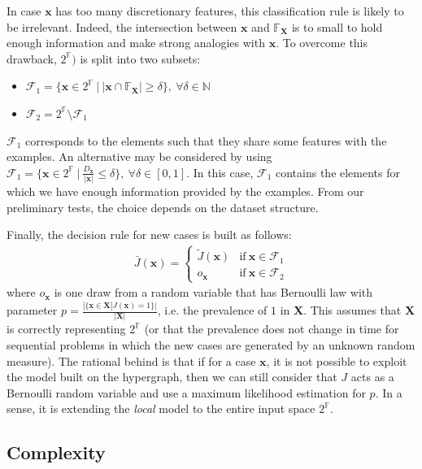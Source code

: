 \documentclass[preprint,12pt]{elsarticle}
\theoremstyle{definition}
\begin{document}
In case $\mathbf x$ has too many discretionary features, this classification rule is likely to be irrelevant. Indeed, the intersection between $\mathbf x$ and $\mathbb{F}_{\mathbf X}$ is to small to hold enough information and make strong analogies with $\mathbf x$. To overcome this drawback, $2^{\mathbb F})$ is split into two subsets:
\begin{itemize}
  \item $\mathcal{F}_1 = \{ \mathbf  x \in 2^{\mathbb F} ~ | ~ |\mathbf x \cap \mathbb{F}_{\mathbf X}| \geq \delta\}, ~ \forall \delta \in \mathbb{N}$
  \item $\mathcal{F}_2 = 2^{\mathbb F} \setminus \mathcal{F}_1$
\end{itemize}
$\mathcal{F}_1$ corresponds to the elements such that they share some features with the examples. An alternative may be considered by using $\mathcal{F}_1 = \{\mathbf  x \in 2^{\mathbb F} ~ | ~ \frac{D_\mathbf x}{|\mathbf x|} \leq \delta\}, ~ \forall \delta \in [0,1]$. In this case, $\mathcal{F}_1$ contains the elements for which we have enough information provided by the examples. From our preliminary tests, the choice depends on the dataset structure.

Finally, the decision rule for new cases is built as follows:
\begin{align}
\tag{R2} \label{eqn:updated_cr}
 \bar J(\mathbf x) = \left\{\begin{matrix}
 \tilde J(\mathbf x) & \text{if} ~ \mathbf x \in \mathcal{F}_1 \\
 o_{\mathbf x} & \text{if} ~ \mathbf x \in \mathcal{F}_2
\end{matrix}\right.
\end{align} where $o_{\mathbf x}$ is one draw from a random variable that has Bernoulli law with parameter $p=\frac{|\{\mathbf x \in \mathbf X | J(\mathbf x) = 1 \}|}{|\mathbf X|}$, i.e. the prevalence of $1$ in $\mathbf X$. This assumes that $\mathbf X$ is correctly representing $2^{\mathbb F}$ (or that the prevalence does not change in time for sequential problems in which the new cases are generated by an unknown random measure). The rational behind is that if for a case $\mathbf x$, it is not possible to exploit the model built on the hypergraph, then we can still consider that $J$ acts as a Bernoulli random variable and use a maximum likelihood estimation for $p$. In a sense, it is extending the {\it local} model to the entire input space $2^\mathbb F$.


\subsection{Complexity}
\label{sec:complexity}
\end{document}
